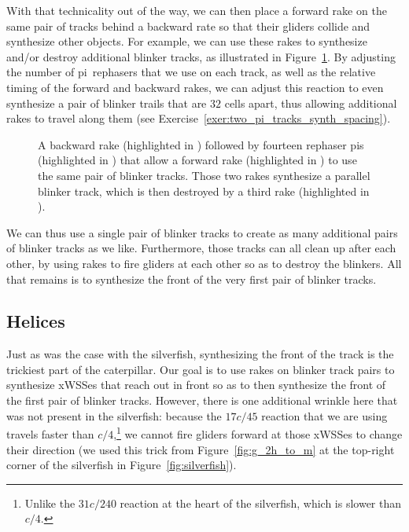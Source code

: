 With that technicality out of the way, we can then place a forward rake on the same pair of tracks behind a backward rate so that their gliders collide and synthesize other objects. For example, we can use these rakes to synthesize and/or destroy additional blinker tracks, as illustrated in Figure~\ref{fig:blinker_trail_synth}. By adjusting the number of pi~rephasers that we use on each track, as well as the relative timing of the forward and backward rakes, we can adjust this reaction to even synthesize a pair of blinker trails that are $32$ cells apart, thus allowing additional rakes to travel along them (see Exercise~\ref{exer:two_pi_tracks_synth_spacing}).

\begin{figure}[!htbp]
	\centering
	\caption{A backward rake (highlighted in ) followed by fourteen rephaser pis (highlighted in ) that allow a forward rake (highlighted in ) to use the same pair of blinker tracks. Those two rakes synthesize a parallel blinker track, which is then destroyed by a third rake (highlighted in ).}\label{fig:blinker_trail_synth}
\end{figure}

We can thus use a single pair of blinker tracks to create as many additional pairs of blinker tracks as we like. Furthermore, those tracks can all clean up after each other, by using rakes to fire gliders at each other so as to destroy the blinkers. All that remains is to synthesize the front of the very first pair of blinker tracks.


\subsection{Helices}\label{sec:caterpillar_helices}

Just as was the case with the silverfish, synthesizing the front of the track is the trickiest part of the caterpillar. Our goal is to use rakes on blinker track pairs to synthesize xWSSes that reach out in front so as to then synthesize the front of the first pair of blinker tracks. However, there is one additional wrinkle here that was not present in the silverfish: because the $17c/45$ reaction that we are using travels faster than $c/4$,\footnote{Unlike the $31c/240$ reaction at the heart of the silverfish, which is slower than $c/4$.} we cannot fire gliders forward at those xWSSes to change their direction (we used this trick from Figure~\ref{fig:g_2h_to_m} at the top-right corner of the silverfish in Figure~\ref{fig:silverfish}).

